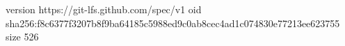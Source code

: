 version https://git-lfs.github.com/spec/v1
oid sha256:f8c6377f3207b8f9ba64185c5988ed9c0ab8cec4ad1c074830e77213ee623755
size 526
